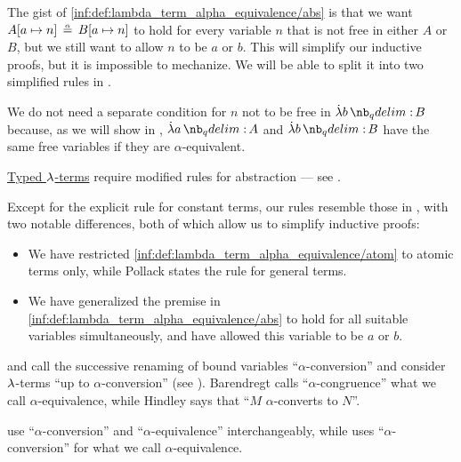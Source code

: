 \begin{definition}
  The gist of \ref{inf:def:lambda_term_alpha_equivalence/abs} is that we want \( A[a \mapsto n] \aequiv B[a \mapsto n] \) to hold for every variable \( n \) that is not free in either \( A \) or \( B \), but we still want to allow \( n \) to be \( a \) or \( b \). This will simplify our inductive proofs, but it is impossible to mechanize. We will be able to split it into two simplified rules in .

  We do not need a separate condition for \( n \) not to be free in \( \qabs b B \) because, as we will show in , \( \qabs a A \) and \( \qabs b B \) have the same free variables if they are \( \alpha \)-equivalent.
\end{definition}
\begin{comments}
  \item \hyperref[def:typed_lambda_term]{Typed \( {\mathrm \lambda} \)-terms} require modified rules for abstraction --- see .

  \item Except for the explicit rule for constant terms, our rules resemble those in \cite[5]{Pollack2005AlphaConversion}, with two notable differences, both of which allow us to simplify inductive proofs:
  \begin{itemize}
    \item We have restricted \ref{inf:def:lambda_term_alpha_equivalence/atom} to atomic terms only, while Pollack states the rule for general terms.
    \item We have generalized the premise in \ref{inf:def:lambda_term_alpha_equivalence/abs} to hold for all suitable variables simultaneously, and have allowed this variable to be \( a \) or \( b \).
  \end{itemize}

  \item {} and  call the successive renaming of bound variables \enquote{\( \alpha \)-conversion} and consider \( {\mathrm \lambda} \)-terms \enquote{up to \( \alpha \)-conversion} (see ). Barendregt calls \enquote{\( \alpha \)-congruence} what we call \( \alpha \)-equivalence, while Hindley says that \enquote{\( M \) \( \alpha \)-converts to \( N \)}.

   use \enquote{\( \alpha \)-conversion} and \enquote{\( \alpha \)-equivalence} interchangeably, while  uses \enquote{\( \alpha \)-conversion} for what we call \( \alpha \)-equivalence.


\end{comments}
